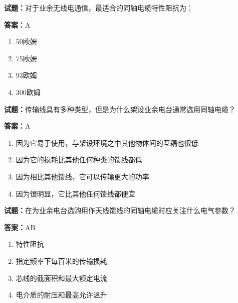 \documentclass{ctexbook}
\begin{document}



\vspace{1em}

\textbf{试题：}对于业余无线电通信，最适合的同轴电缆特性阻抗为： 

\textbf{答案：}A 

\begin{enumerate}[leftmargin=3em]
  \item 50欧姆 

  \item 75欧姆 

  \item 93欧姆 

  \item 300欧姆 

\end{enumerate}





\vspace{1em}

\textbf{试题：}传输线具有多种类型，但是为什么架设业余电台通常选用同轴电缆？ 

\textbf{答案：}A 

\begin{enumerate}[leftmargin=3em]
  \item 因为它易于使用，与架设环境之中其他物体间的互耦也很低 

  \item 因为它的损耗比其他任何种类的馈线都低 

  \item 因为相比其他馈线，它可以传输更大的功率 

  \item 因为很明显，它比其他任何馈线都便宜 

\end{enumerate}





\vspace{1em}

\textbf{试题：}在为业余电台选购用作天线馈线的同轴电缆时应关注什么电气参数？ 

\textbf{答案：}AB 

\begin{enumerate}[leftmargin=3em]
  \item 特性阻抗 

  \item 指定频率下每百米的传输损耗 

  \item 芯线的截面积和最大额定电流 

  \item 电介质的耐压和最高允许温升 

\end{enumerate}
\end{document}
